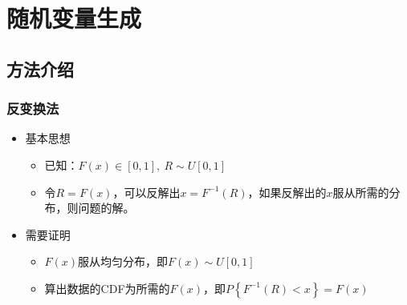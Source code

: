 \chapter{随机变量生成}
\section{方法介绍}
\subsection{反变换法}
\begin{newprop}
    \begin{itemize}
        \item 基本思想
        \begin{itemize}
            \item 已知：$F(x) \in[0,1],\ R\sim U[0,1] $
            \item 令$R=F(x)$，可以反解出$x = F^{-1}(R)$，如果反解出的$x$服从所需的分布，则问题的解。
        \end{itemize}
        \item 需要证明
        \begin{itemize}
            \item $F(x)$服从\textcolor{thid1}{均匀分布}，即$F(x)\sim U[0,1]$
            \item 算出数据的CDF为所需的$F(x)$，即$P\left\lbrace F^{-1}(R)<x \right\rbrace = F(x) $
        \end{itemize}
    \end{itemize}
\end{newprop}
